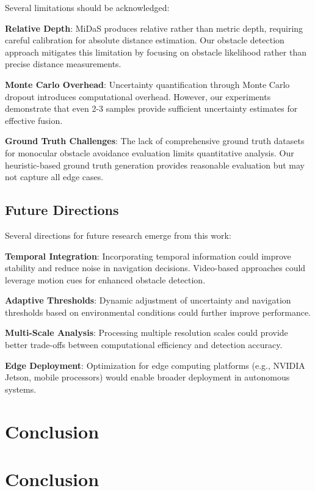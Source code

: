 \documentclass[10pt]{article}
\begin{document}
Several limitations should be acknowledged:

\textbf{Relative Depth}: MiDaS produces relative rather than metric depth, requiring careful calibration for absolute distance estimation. Our obstacle detection approach mitigates this limitation by focusing on obstacle likelihood rather than precise distance measurements.

\textbf{Monte Carlo Overhead}: Uncertainty quantification through Monte Carlo dropout introduces computational overhead. However, our experiments demonstrate that even 2-3 samples provide sufficient uncertainty estimates for effective fusion.

\textbf{Ground Truth Challenges}: The lack of comprehensive ground truth datasets for monocular obstacle avoidance evaluation limits quantitative analysis. Our heuristic-based ground truth generation provides reasonable evaluation but may not capture all edge cases.

\subsection{Future Directions}

Several directions for future research emerge from this work:

\textbf{Temporal Integration}: Incorporating temporal information could improve stability and reduce noise in navigation decisions. Video-based approaches could leverage motion cues for enhanced obstacle detection.

\textbf{Adaptive Thresholds}: Dynamic adjustment of uncertainty and navigation thresholds based on environmental conditions could further improve performance.

\textbf{Multi-Scale Analysis}: Processing multiple resolution scales could provide better trade-offs between computational efficiency and detection accuracy.

\textbf{Edge Deployment}: Optimization for edge computing platforms (e.g., NVIDIA Jetson, mobile processors) would enable broader deployment in autonomous systems.

\section{Conclusion}

\section{Conclusion}
\end{document}
